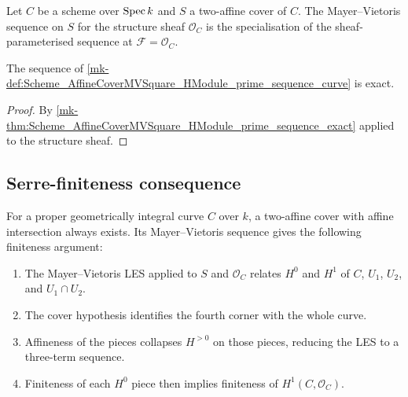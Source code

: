 \begin{definition}\label{mk-def:Scheme_AffineCoverMVSquare_HModule_prime_sequence_curve}
  \leanok


  Let \(C\) be a scheme over \(\operatorname{Spec} k\) and \(S\) a two-affine cover of \(C\). The Mayer--Vietoris sequence on \(S\) for the structure sheaf \(\mathcal O_C\) is the specialisation of the sheaf-parameterised sequence at \(\mathcal F = \mathcal O_C\).
\end{definition}

\begin{theorem}\label{mk-thm:Scheme_AffineCoverMVSquare_HModule_prime_sequence_curve_exact}
  \leanok


  The sequence of \ref{mk-def:Scheme_AffineCoverMVSquare_HModule_prime_sequence_curve} is exact.
\end{theorem}

\begin{proof}
  \leanok


By \ref{mk-thm:Scheme_AffineCoverMVSquare_HModule_prime_sequence_exact} applied to the structure sheaf.
\end{proof}

\subsection{Serre-finiteness consequence}

For a proper geometrically integral curve \(C\) over \(k\), a two-affine cover with affine intersection always exists. Its Mayer--Vietoris sequence gives the following finiteness argument:
\begin{enumerate}
  \item The Mayer--Vietoris LES applied to \(S\) and \(\mathcal O_C\) relates \(H^0\) and \(H^1\) of \(C\), \(U_1\), \(U_2\), and \(U_1 \cap U_2\).
  \item The cover hypothesis identifies the fourth corner with the whole curve.
  \item Affineness of the pieces collapses \(H^{>0}\) on those pieces, reducing the LES to a three-term sequence.
  \item Finiteness of each \(H^0\) piece then implies finiteness of \(H^1(C, \mathcal O_C)\).
\end{enumerate}
